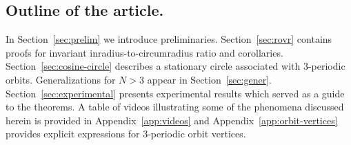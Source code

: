\bigskip
\subsection{Outline of the article.} In Section~\ref{sec:prelim} we introduce preliminaries. Section~\ref{sec:rovr} contains proofs for invariant inradius-to-circumradius ratio and corollaries. Section~\ref{sec:cosine-circle} describes a stationary circle associated with 3-periodic orbits. Generalizations for $N>3$ appear in Section~\ref{sec:gener}. Section~\ref{sec:experimental} presents experimental results which served as a guide to the theorems. A table of videos illustrating some of the phenomena discussed herein is provided in Appendix~\ref{app:videos} and Appendix~\ref{app:orbit-vertices} provides explicit expressions for 3-periodic orbit vertices.